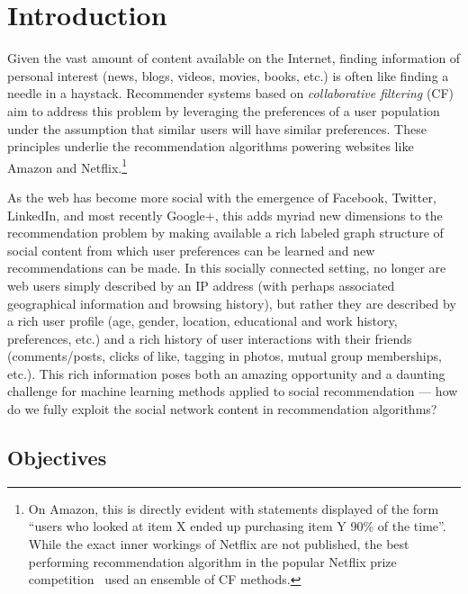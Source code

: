 
\chapter{Introduction}
\label{cha:intro}

Given the vast amount of content available on the Internet, finding
information of personal interest (news, blogs, videos, movies, books,
etc.) is often like finding a needle in a haystack.  Recommender
systems based on \emph{collaborative filtering} (CF) aim to address
this problem by leveraging the preferences of a user
population under the assumption that similar users
will have similar preferences.  These principles underlie the
recommendation algorithms powering websites like Amazon and
Netflix.\footnote{On Amazon, this is directly evident with statements
displayed of the form ``users who looked at item X ended up purchasing
item Y 90\% of the time''.  While the exact inner workings of Netflix
are not published, the best performing recommendation algorithm in
the popular Netflix prize competition~\cite{netflix} 
used an ensemble of CF methods.}

As the web has become more social with the emergence of Facebook,
Twitter, LinkedIn, and most recently Google+, this adds myriad new
dimensions to the recommendation problem by making available a rich
labeled graph structure of social content from which user preferences
can be learned and new recommendations can be made.  In this socially
connected setting, no longer are web users simply described by an IP
address (with perhaps associated geographical information and browsing
history), but rather they are described by a rich user profile (age,
gender, location, educational and work history, preferences, etc.)
and a rich history of user interactions with their friends (comments/posts, 
clicks of like, tagging in photos, mutual group
memberships, etc.).  This rich information poses both an amazing
opportunity and a daunting challenge for machine learning methods
applied to social recommendation --- how do we fully exploit the social
network content in recommendation algorithms?

\section{Objectives}
\label{sec:objective}

